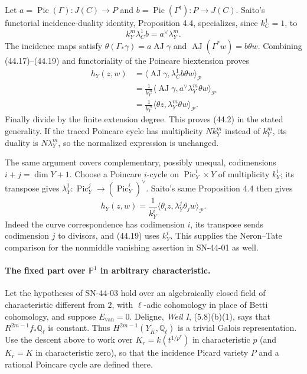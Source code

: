 Let $a=\operatorname{Pic}(\Gamma):J(C)\to P$ and
$b=\operatorname{Pic}(\Gamma^{\mathsf t}):P\to J(C)$.
Saito's functorial incidence-duality identity, Proposition 4.4,
specializes, since $k_C^1=1$, to
\[
 k_Y^m\lambda_C^1 b=a^\vee\lambda_Y^m.                    \tag{44.19}
\]
The incidence maps satisfy
$\theta(\Gamma_*\gamma)=a\operatorname{AJ}\gamma$ and
$\operatorname{AJ}(\Gamma^*w)=b\theta w$.
Combining (44.17)--(44.19) and functoriality of the Poincare
biextension proves
\[
\begin{split}
h_Y(z,w)
 &=\langle\operatorname{AJ}\gamma,
                 \lambda_C^1 b\theta w\rangle_{\mathcal P}\\
 &=\frac1{k_Y^m}\langle\operatorname{AJ}\gamma,
                 a^\vee\lambda_Y^m\theta w\rangle_{\mathcal P}\\
 &=\frac1{k_Y^m}\langle\theta z,
                 \lambda_Y^m\theta w\rangle_{\mathcal P}.
\end{split}
\]
Finally divide by the finite extension degree.  This proves
(44.2) in the stated generality.  If the traced Poincare cycle
has multiplicity $N k_Y^m$ instead of $k_Y^m$, its duality is
$N\lambda_Y^m$, so the normalized expression is unchanged.

The same argument covers complementary, possibly unequal,
codimensions $i+j=\dim Y+1$.  Choose a Poincare $i$-cycle on
$\operatorname{Pic}^i_Y\times Y$ of multiplicity $k_Y^i$; its
transpose gives
$\lambda_Y^j:\operatorname{Pic}^j_Y\to
(\operatorname{Pic}^i_Y)^\vee$.  Saito's same Proposition 4.4
then gives
\[
 h_Y(z,w)=\frac1{k_Y^i}
       \langle\theta_i z,\lambda_Y^j\theta_j w\rangle_{\mathcal P}.
\]
Indeed the curve correspondence has codimension $i$, its transpose
sends codimension $j$ to divisors, and (44.19) uses $k_Y^i$.
This supplies the Neron--Tate comparison for the nonmiddle
vanishing assertion in SN-44-01 as well.

\paragraph{The fixed part over $\mathbb P^1$ in arbitrary characteristic.}
Let the hypotheses of SN-44-03 hold over an algebraically closed
field of characteristic different from $2$, with $\ell$-adic
cohomology in place of Betti cohomology, and suppose
$E_{\mathrm{van}}=0$.  Deligne, \emph{Weil I}, (5.8)(b)(1),
says that $R^{2m-1}f_*\mathbb Q_\ell$ is constant.  Thus
$H^{2m-1}(Y_{\overline K},\mathbb Q_\ell)$ is a trivial
Galois representation.  Use the descent above to work over
$K_r=k(t^{1/p^r})$ in characteristic $p$ (and $K_r=K$ in
characteristic zero), so that the incidence Picard variety $P$
and a rational Poincare cycle are defined there.

